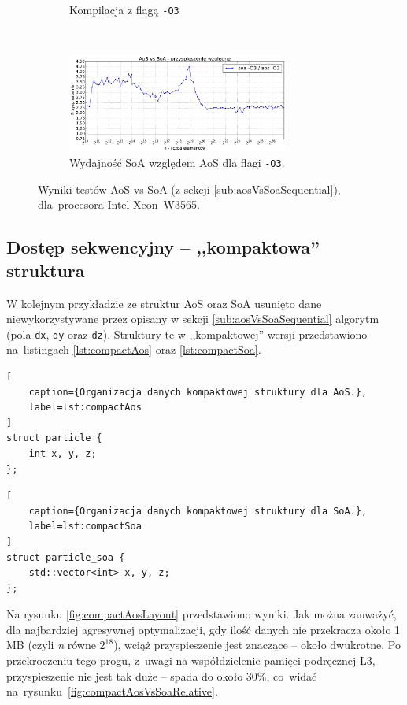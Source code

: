 \begin{figure}
\begin{subfigure}[c]{0.45\textwidth}
        \caption{Kompilacja z flagą \texttt{-O3}}
    \end{subfigure}
    \\
    \vspace{0.55cm}
    \begin{subfigure}[c]{1.0\textwidth}
        \centering
        \includegraphics[width=0.80\textwidth]{images/benchs_xeon/aos_vs_soa_normalized}
        \caption{Wydajność SoA względem AoS dla flagi \texttt{-O3}.}
    \end{subfigure}
    \caption{Wyniki testów AoS vs SoA (z sekcji \ref{sub:aosVsSoaSequential}), dla~procesora Intel \mbox{Xeon W3565}.}
    \label{fig:aosVsSoaSequentialXeon}
\end{figure}

\clearpage

\subsection{Dostęp sekwencyjny -- ,,kompaktowa'' struktura}
\label{sub:compactAosVsSoa}
W kolejnym przykładzie ze struktur AoS oraz SoA usunięto dane niewykorzystywane przez opisany w sekcji \ref{sub:aosVsSoaSequential} algorytm (pola \texttt{dx}, \texttt{dy} oraz \texttt{dz}). Struktury te w ,,kompaktowej'' wersji przedstawiono na~listingach \ref{lst:compactAos} oraz \ref{lst:compactSoa}.

\begin{lstlisting}[
    caption={Organizacja danych kompaktowej struktury dla AoS.},
    label=lst:compactAos
]
struct particle {
    int x, y, z;
};
\end{lstlisting}
\begin{lstlisting}[
    caption={Organizacja danych kompaktowej struktury dla SoA.},
    label=lst:compactSoa
]
struct particle_soa {
    std::vector<int> x, y, z;
};
\end{lstlisting}

Na rysunku \ref{fig:compactAosLayout} przedstawiono wyniki. Jak można zauważyć, dla najbardziej agresywnej optymalizacji,  gdy ilość danych nie przekracza około 1 MB (czyli \textit{n} równe $2^{18}$), wciąż przyspieszenie jest znaczące -- około dwukrotne. Po przekroczeniu tego progu, z~uwagi na współdzielenie pamięci podręcznej L3, przyspieszenie nie jest tak duże -- spada do około 30\%, co~widać na~rysunku~\ref{fig:compactAosVsSoaRelative}.

